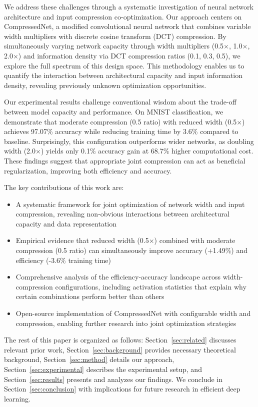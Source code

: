 \documentclass{article} %
\begin{document}
We address these challenges through a systematic investigation of neural network architecture and input compression co-optimization. Our approach centers on CompressedNet, a modified convolutional neural network that combines variable width multipliers with discrete cosine transform (DCT) compression. By simultaneously varying network capacity through width multipliers (0.5$\times$, 1.0$\times$, 2.0$\times$) and information density via DCT compression ratios (0.1, 0.3, 0.5), we explore the full spectrum of this design space. This methodology enables us to quantify the interaction between architectural capacity and input information density, revealing previously unknown optimization opportunities.

Our experimental results challenge conventional wisdom about the trade-off between model capacity and performance. On MNIST classification, we demonstrate that moderate compression (0.5 ratio) with reduced width (0.5$\times$) achieves 97.07\% accuracy while reducing training time by 3.6\% compared to baseline. Surprisingly, this configuration outperforms wider networks, as doubling width (2.0$\times$) yields only 0.1\% accuracy gain at 68.7\% higher computational cost. These findings suggest that appropriate joint compression can act as beneficial regularization, improving both efficiency and accuracy.

The key contributions of this work are:
\begin{itemize}
    \item A systematic framework for joint optimization of network width and input compression, revealing non-obvious interactions between architectural capacity and data representation
    \item Empirical evidence that reduced width (0.5$\times$) combined with moderate compression (0.5 ratio) can simultaneously improve accuracy (+1.49\%) and efficiency (-3.6\% training time)
    \item Comprehensive analysis of the efficiency-accuracy landscape across width-compression configurations, including activation statistics that explain why certain combinations perform better than others
    \item Open-source implementation of CompressedNet with configurable width and compression, enabling further research into joint optimization strategies
\end{itemize}

The rest of this paper is organized as follows: Section~\ref{sec:related} discusses relevant prior work, Section~\ref{sec:background} provides necessary theoretical background, Section~\ref{sec:method} details our approach, Section~\ref{sec:experimental} describes the experimental setup, and Section~\ref{sec:results} presents and analyzes our findings. We conclude in Section~\ref{sec:conclusion} with implications for future research in efficient deep learning.
\end{document}
